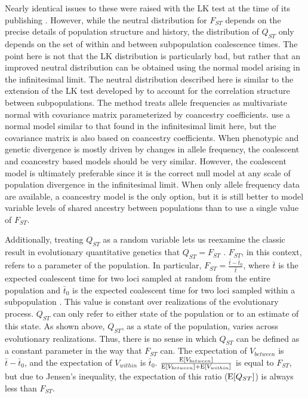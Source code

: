 Nearly identical issues to these were raised with the LK test at the time of its
publishing \citep{Nei1975,Robertson1975}. However, while the neutral
distribution for $F_{ST}$ depends on the precise details of population structure
and history, the distribution of $Q_{ST}$ only depends on the set of within and
between subpopulation coalescence times. The point here is not that the LK
distribution is particularly bad, but rather that an improved neutral
distribution can be obtained using the normal model arising in the infinitesimal
limit. The neutral distribution described here is similar to the extension of
the LK test developed by \citet{Bonhomme2010} to account for the correlation
structure between subpopulations. The \citet{Bonhomme2010} method treats allele
frequencies as multivariate normal with covariance matrix parameterized by
coancestry coefficients. \citet{Ovaskainen2011} use a normal model similar to
that found in the infinitesimal limit here, but the covariance matrix is also
based on coancestry coefficients. When phenotypic and genetic divergence is
mostly driven by changes in allele frequency, the coalescent and coancestry
based models should be very similar. However, the coalescent model is ultimately
preferable since it is the correct null model at any scale of population
divergence in the infinitesimal limit. When only allele frequency data are
available, a coancestry model is the only option, but it is still better to
model variable levels of shared ancestry between populations than to use a
single value of $F_{ST}$.

Additionally, treating $Q_{ST}$ as a random variable lets us reexamine the
classic result in evolutionary quantitative genetics that $Q_{ST}=F_{ST}$
\citep{Whitlock1999}. $F_{ST}$, in this context, refers to a parameter of the
population. In particular, $F_{ST} = \frac{\bar{t} - \bar{t}_0}{\bar{t}}$, where
$\bar{t}$ is the expected coalescent time for two loci sampled at random from
the entire population and $\bar{t}_0$ is the expected coalescent time for two
loci sampled within a subpopulation \citep{Slatkin1991}. This value is constant
over realizations of the evolutionary process. $Q_{ST}$ can only refer to either
state of the population or to an estimate of this state. As shown above,
$Q_{ST}$, as a state of the population, varies across evolutionary realizations.
Thus, there is no sense in which $Q_{ST}$ can be defined as a constant parameter
in the way that $F_{ST}$ can. The expectation of $V_{between}$ is $\bar{t} -
\bar{t}_0$, and the expectation of $V_{within}$ is $\bar{t}_0$.
$\frac{\mathrm{E}[V_{between}]}{\mathrm{E}[V_{between}] + \mathrm{E}[V_{within}]}$ is equal to $F_{ST}$,
but due to Jensen's inequality, the expectation of this ratio ($\mathrm{E}[Q_{ST}]$) is
always less than $F_{ST}$.

